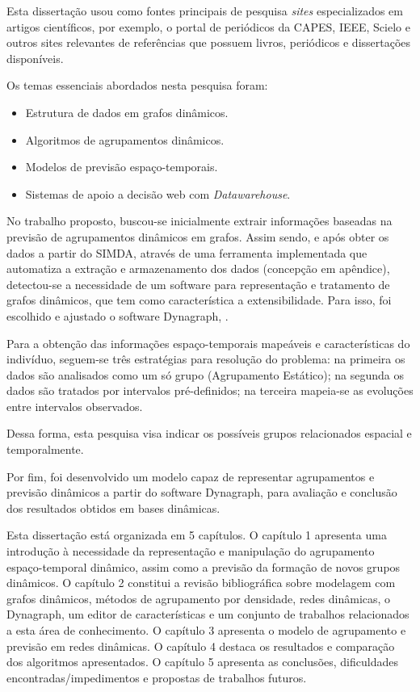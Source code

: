 
Esta dissertação usou como fontes principais de pesquisa \textit{sites} especializados em artigos científicos, por exemplo, o portal de periódicos da \acrshort{CAPES}, \acrshort{IEEE}, Scielo e outros sites relevantes de referências que possuem livros, periódicos e dissertações disponíveis.

Os temas essenciais abordados nesta pesquisa foram:
\begin{itemize}
	\item Estrutura de dados em grafos dinâmicos.
	\item Algoritmos de agrupamentos dinâmicos.
	\item Modelos de previsão espaço-temporais.
	\item Sistemas de apoio a decisão web com \emph{Datawarehouse}.
\end{itemize}

No trabalho proposto, buscou-se inicialmente extrair informações baseadas na previsão de agrupamentos dinâmicos em grafos. Assim sendo, e após obter os dados a partir do \acrshort{SIMDA}, através de uma ferramenta implementada que automatiza a extração e armazenamento dos dados (concepção em apêndice), detectou-se a necessidade de um software para representação e tratamento de grafos dinâmicos, que tem como característica a extensibilidade. Para isso, foi escolhido e ajustado o software Dynagraph, \cite{dynagraph}.

Para a obtenção das informações espaço-temporais mapeáveis e características do indivíduo, seguem-se três estratégias para resolução do problema: na primeira os dados são analisados como um só grupo (Agrupamento Estático); na segunda os dados são tratados por intervalos pré-definidos; na terceira mapeia-se as evoluções entre intervalos observados.

Dessa forma, esta pesquisa visa indicar os possíveis grupos relacionados espacial e temporalmente.

Por fim, foi desenvolvido um modelo capaz de representar agrupamentos e previsão dinâmicos a partir do software Dynagraph, para avaliação e conclusão dos resultados obtidos em bases dinâmicas.


Esta dissertação está organizada em 5 capítulos. O capítulo 1 apresenta uma
introdução à necessidade da representação e manipulação do agrupamento espaço-temporal dinâmico, assim como a previsão da formação de novos grupos dinâmicos. O capítulo 2 constitui a revisão bibliográfica sobre modelagem com grafos dinâmicos, métodos de agrupamento por densidade, redes dinâmicas, o Dynagraph, um editor de características e um conjunto de trabalhos relacionados a esta área de conhecimento. O capítulo 3 apresenta o modelo de agrupamento e previsão em redes dinâmicas. O capítulo 4 destaca
os resultados e comparação dos algoritmos apresentados. O capítulo 5 apresenta as conclusões, dificuldades encontradas/impedimentos e propostas de trabalhos futuros.








